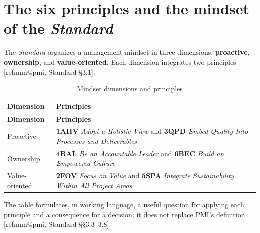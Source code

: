 \documentclass[11pt,a4paper]{article}
\makeatletter
\newcommand{\refnum}[1]{\csname refnum@#1\endcsname}
\newcommand{\cit}[1]{[\refnum{#1}]}
\newcommand{\SingleSpacing}{}
\newcommand{\fontetab}[1]{\par\vspace{3pt}{\small\noindent Source: #1\par}}
\makeatother
\begin{document}
\section{The six principles and the mindset of the \textit{Standard}}

The \textit{Standard} organizes a management mindset in three dimensions: \textbf{proactive}, \textbf{ownership}, and \textbf{value-oriented}. Each dimension integrates two principles [\refnum{pmi}, Standard §3.1].

\begingroup\SingleSpacing\small
\begin{longtable}{@{}>{\raggedright\arraybackslash}p{}>{\raggedright\arraybackslash}p{}@{}}
\caption{Mindset dimensions and principles}\label{tab:t2}\\
\toprule
\textbf{Dimension} & \textbf{Principles}\\
\midrule
\endfirsthead
\toprule
\textbf{Dimension} & \textbf{Principles}\\
\midrule
\endhead
\bottomrule
\endfoot
\bottomrule
\endlastfoot
Proactive & \textbf{1AHV} \textit{Adopt a Holistic View} and \textbf{3QPD} \textit{Embed Quality Into Processes and Deliverables}\\[3pt]
Ownership & \textbf{4BAL} \textit{Be an Accountable Leader} and \textbf{6BEC} \textit{Build an Empowered Culture}\\[3pt]
Value-oriented & \textbf{2FOV} \textit{Focus on Value} and \textbf{5SPA} \textit{Integrate Sustainability Within All Project Areas}\\[3pt]
\end{longtable}
\endgroup
\fontetab{Prepared by the authors (2026), based on \cit{pmi}.}

The table formulates, in working language, a useful question for applying each principle and a consequence for a decision; it does not replace PMI's definition [\refnum{pmi}, Standard §§3.3–3.8].
\end{document}

